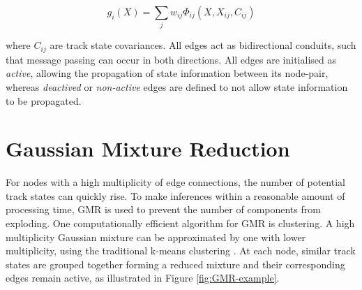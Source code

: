 \begin{equation}
g_i(X) = \sum_{j} w_{ij}\Phi_{ij}(X, X_{ij}, C_{ij})
\label{eqn:gaussian-mixture}
\end{equation}

where $C_{ij}$ are track state covariances. All edges act as bidirectional conduits, such that message passing can occur in both directions. All edges are initialised as \textit{active}, allowing the propagation of state information between its node-pair, whereas \textit{deactived} or \textit{non-active} edges are defined to not allow state information to be propagated. 






\section{Gaussian Mixture Reduction}
\label{section-GMR}

For nodes with a high multiplicity of edge connections, the number of potential track states can quickly rise. To make inferences within a reasonable amount of processing time, GMR is used to prevent the number of components from exploding. One computationally efficient algorithm for GMR is clustering. A high multiplicity Gaussian mixture can be approximated by one with lower multiplicity, using the traditional k-means clustering \cite{kmeans}. At each node, similar track states are grouped together forming a reduced mixture and their corresponding edges remain active, as illustrated in Figure \ref{fig:GMR-example}. 


